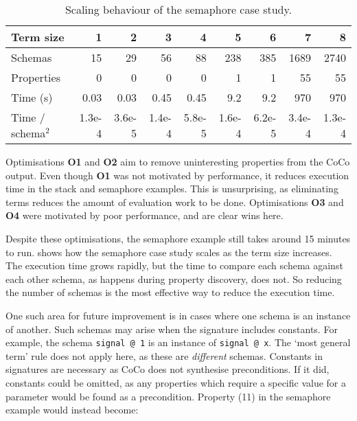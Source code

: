 \begin{table}[t]
\centering
\begin{tabular}{lrrrrrrrr} \toprule
  Term size           &  1     &   2    &   3    &   4    &     5   &     6   &      7 &      8 \\ \midrule
  Schemas             & 15     &  29    &  56    &  88    &   238   &   385   &   1689 &   2740 \\
  Properties          &  0     &   0    &   0    &   0    &     1   &     1   &     55 &     55 \\
  Time (s)            &  0.03  &   0.03 &   0.45 &   0.45 &     9.2 &     9.2 &    970 &    970 \\ \midrule
  Time / schema$^{2}$ & 1.3e-4 & 3.6e-5 & 1.4e-4 & 5.8e-5 & 1.6e-4  & 6.2e-5  & 3.4e-4 & 1.3e-4 \\ \bottomrule
\end{tabular}
\caption{Scaling behaviour of the semaphore case study.}
\label{tbl:coco-scaling}
\end{table}

Optimisations \textbf{O1} and \textbf{O2} aim to remove uninteresting
properties from the CoCo output.  Even though \textbf{O1} was not
motivated by performance, it reduces execution time in the stack and
semaphore examples.  This is unsurprising, as eliminating terms
reduces the amount of evaluation work to be done.  Optimisations
\textbf{O3} and \textbf{O4} were motivated by poor performance, and
are clear wins here.

Despite these optimisations, the semaphore example still takes around
15 minutes to run.   shows how the semaphore
case study scales as the term size increases.  The execution time
grows rapidly, but the time to compare each schema against each other
schema, as happens during property discovery, does not.  So reducing
the number of schemas is the most effective way to reduce the
execution time.

One such area for future improvement is in cases where one schema is
an instance of another.  Such schemas may arise when the signature
includes constants.  For example, the schema \verb|signal @ 1| is an
instance of \verb|signal @ x|.  The `most general term' rule does not
apply here, as these are \emph{different} schemas.  Constants in
signatures are necessary as CoCo does not synthesise preconditions.
If it did, constants could be omitted, as any properties which require
a specific value for a parameter would be found as a precondition.
Property (11) in the semaphore example would instead become:


